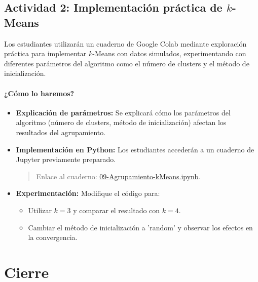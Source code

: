 \documentclass[a4,11pt]{aleph-notas}
\begin{document}
\subsection*{Actividad 2: Implementación práctica de $k$-Means}

Los estudiantes utilizarán un cuaderno de Google Colab mediante exploración práctica para implementar $k$-Means con datos simulados, experimentando con diferentes parámetros del algoritmo como el número de clusters y el método de inicialización.

\paragraph{¿Cómo lo haremos?}  
\begin{itemize}[leftmargin=*]
    \item \textbf{Explicación de parámetros:} 
    Se explicará cómo los parámetros del algoritmo (número de clusters, método de inicialización) afectan los resultados del agrupamiento.
    
    \item \textbf{Implementación en Python:} Los estudiantes accederán a un cuaderno de Jupyter previamente preparado.
    \begin{quote}
        Enlace al cuaderno: \href{https://colab.research.google.com/github/andres-merino/AprendizajeAutomaticoInicial-05-N0105/blob/main/2-Notebooks/09-Agrupamiento-kMeans.ipynb}{09-Agrupamiento-kMeans.ipynb}.
    \end{quote}
    
    \item \textbf{Experimentación:} 
    Modifique el código para:
    \begin{itemize}[leftmargin=*]
        \item Utilizar $k=3$ y comparar el resultado con $k=4$.
        \item Cambiar el método de inicialización a 'random' y observar los efectos en la convergencia.
    \end{itemize}
    
\end{itemize}

\section*{Cierre}
\end{document}

